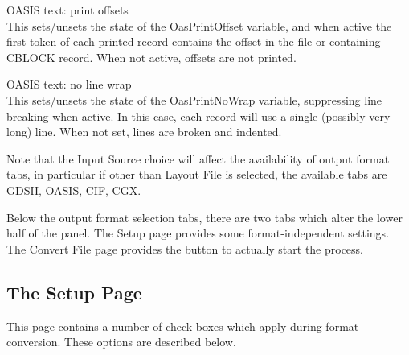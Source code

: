 \begin{description}
\begin{description}
\item{\cb OASIS text: print offsets}\\
This sets/unsets the state of the {\et OasPrintOffset} variable, and
when active the first token of each printed record contains the offset
in the file or containing CBLOCK record.  When not active, offsets are
not printed.

\item{\cb OASIS text: no line wrap}\\
This sets/unsets the state of the {\et OasPrintNoWrap} variable,
suppressing line breaking when active.  In this case, each record will
use a single (possibly very long) line.  When not set, lines are
broken and indented.
\end{description}
\end{description}

Note that the {\cb Input Source} choice will affect the availability
of output format tabs, in particular if other than {\cb Layout File}
is selected, the available tabs are {\cb GDSII}, {\cb OASIS}, {\cb
CIF}, {\cb CGX}.

Below the output format selection tabs, there are two tabs which alter
the lower half of the panel.  The {\cb Setup} page provides some
format-independent settings.  The {\cb Convert File} page provides the
button to actually start the process.

\subsection{The Setup Page}

This page contains a number of check boxes which apply during format
conversion.  These options are described below.

